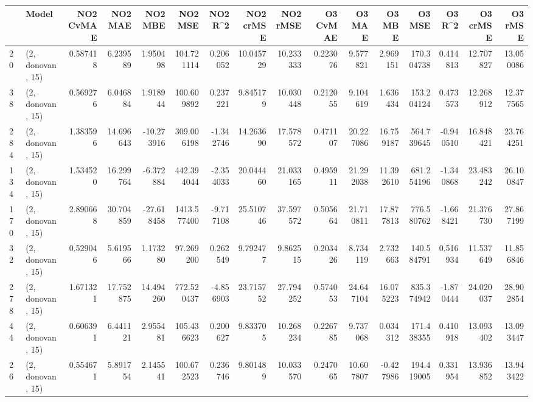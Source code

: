 \begin{tabular}{llrrrrrrrrrrrrrr}
\toprule
{} &             Model &  NO2 CvMAE &    NO2 MAE &    NO2 MBE &      NO2 MSE &    NO2 R\textasciicircum2 &  NO2 crMSE &   NO2 rMSE &  O3 CvMAE &     O3 MAE &     O3 MBE &       O3 MSE &    O3 R\textasciicircum2 &   O3 crMSE &    O3 rMSE \\
\midrule
20  &  (2, donovan, 15) &   0.587418 &   6.239589 &   1.950498 &   104.721114 &   0.206052 &  10.045729 &  10.233333 &  0.223076 &   9.577821 &   2.969151 &   170.304738 &  0.414813 &  12.707827 &  13.050086 \\
38  &  (2, donovan, 15) &   0.569276 &   6.046884 &   1.918944 &   100.609892 &   0.237221 &   9.845179 &  10.030448 &  0.212055 &   9.104619 &   1.636434 &   153.204124 &  0.473573 &  12.268912 &  12.377565 \\
284 &  (2, donovan, 15) &   1.383596 &  14.696643 & -10.273916 &   309.006198 &  -1.342746 &  14.263690 &  17.578572 &  0.471107 &  20.227086 &  16.759187 &   564.739645 & -0.940510 &  16.848421 &  23.764251 \\
134 &  (2, donovan, 15) &   1.534520 &  16.299764 &  -6.372884 &   442.394044 &  -2.354033 &  20.044460 &  21.033165 &  0.495911 &  21.292038 &  11.392610 &   681.254196 & -1.340868 &  23.483242 &  26.100847 \\
170 &  (2, donovan, 15) &   2.890668 &  30.704859 & -27.618458 &  1413.577400 &  -9.717108 &  25.510746 &  37.597572 &  0.505664 &  21.710811 &  17.877813 &   776.580762 & -1.668421 &  21.376730 &  27.867199 \\
32  &  (2, donovan, 15) &   0.529046 &   5.619566 &   1.173280 &    97.269200 &   0.262549 &   9.792477 &   9.862515 &  0.203426 &   8.734119 &   2.732663 &   140.584791 &  0.516934 &  11.537649 &  11.856846 \\
278 &  (2, donovan, 15) &   1.671321 &  17.752875 &  14.494260 &   772.520437 &  -4.856903 &  23.715752 &  27.794252 &  0.574053 &  24.647104 &  16.075223 &   835.374942 & -1.870444 &  24.020037 &  28.902854 \\
44  &  (2, donovan, 15) &   0.606391 &   6.441121 &   2.955481 &   105.436623 &   0.200627 &   9.833705 &  10.268234 &  0.226785 &   9.737068 &   0.034312 &   171.438355 &  0.410918 &  13.093402 &  13.093447 \\
26  &  (2, donovan, 15) &   0.554671 &   5.891754 &   2.145541 &   100.672523 &   0.236746 &   9.801489 &  10.033570 &  0.247065 &  10.607807 &  -0.427986 &   194.419005 &  0.331954 &  13.936852 &  13.943422 \\

\end{tabular}
